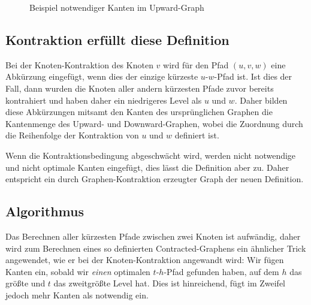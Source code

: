 \begin{figure}[h!]
  \centering
  \caption{Beispiel notwendiger Kanten im Upward-Graph}
  \label{fig:people:notwendige_kanten}
\end{figure}

\subsection{Kontraktion erfüllt diese Definition}

Bei der Knoten-Kontraktion des Knoten $v$ wird für den Pfad $(u, v, w)$ eine Abkürzung eingefügt, wenn dies der einzige kürzeste $u$-$w$-Pfad ist.
Ist dies der Fall, dann wurden die Knoten aller andern kürzesten Pfade zuvor bereits kontrahiert und haben daher ein niedrigeres Level als $u$ und $w$.
Daher bilden diese Abkürzungen mitsamt den Kanten des ursprünglichen Graphen die Kantenmenge des Upward- und Downward-Graphen, wobei die Zuordnung durch die Reihenfolge der Kontraktion von $u$ und $w$ definiert ist.

Wenn die Kontraktionsbedingung abgeschwächt wird, werden nicht notwendige und nicht optimale Kanten eingefügt, dies lässt die Definition aber zu.
Daher entspricht ein durch Graphen-Kontraktion erzeugter Graph der neuen Definition.

\subsection{Algorithmus}

Das Berechnen aller kürzesten Pfade zwischen zwei Knoten ist aufwändig, daher wird zum Berechnen eines so definierten Contracted-Graphens ein ähnlicher Trick angewendet, wie er bei der Knoten-Kontraktion angewandt wird:
Wir fügen Kanten ein, sobald wir \emph{einen} optimalen $t$-$h$-Pfad gefunden haben, auf dem $h$ das größte und $t$ das zweitgrößte Level hat.
Dies ist hinreichend, fügt im Zweifel jedoch mehr Kanten als notwendig ein.

